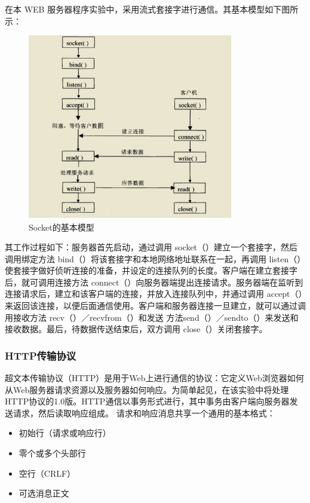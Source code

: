 \documentclass[UTF8,12pt]{article}
\begin{document}
在本 WEB 服务器程序实验中，采用流式套接字进行通信。其基本模型如下图所示：
\begin{figure}[htbp]
    \centering
    \includegraphics[width=0.8\textwidth]{img/2.png}
    \caption{Socket的基本模型}
\end{figure}

其工作过程如下：服务器首先启动，通过调用 socket（）建立一个套接字，然后调用绑定方法 bind（）将该套接字和本地网络地址联系在一起，再调用 listen（）使套接字做好侦听连接的准备，并设定的连接队列的长度。客户端在建立套接字后，就可调用连接方法 connect（）向服务器端提出连接请求。服务器端在监听到连接请求后，建立和该客户端的连接，并放入连接队列中，并通过调用 accept（）来返回该连接，以便后面通信使用。客户端和服务器连接一旦建立，就可以通过调用接收方法 recv（）／recvfrom（）和发送 方法send（）／sendto（）来发送和接收数据。最后，待数据传送结束后，双方调用 close（）关闭套接字。

\subsubsection{HTTP传输协议}
超文本传输协议（HTTP）是用于Web上进行通信的协议：它定义Web浏览器如何从Web服务器请求资源以及服务器如何响应。为简单起见，在该实验中将处理HTTP协议的1.0版。HTTP通信以事务形式进行，其中事务由客户端向服务器发送请求，然后读取响应组成。 请求和响应消息共享一个通用的基本格式：

\begin{itemize}
    \item 初始行（请求或响应行）
    \item 零个或多个头部行
    \item 空行（CRLF）
    \item 可选消息正文
\end{itemize}
\end{document}
